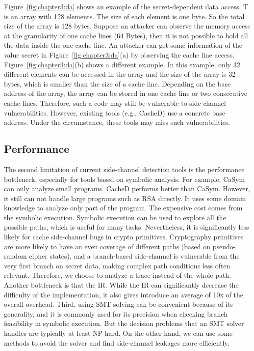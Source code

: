 Figure~\ref{fig:chapter3:da} shows an example of the secret-dependent data access. \textsf{T} is an array with 128 elements. The size of each element is one byte. So the total size of the array is 128 bytes. Suppose an attacker can observe the memory access at the granularity of one cache lines (64 Bytes), then it is not possible to hold all the data inside the one cache line. An attacker can get some information of the value \textsf{secret} in Figure~\ref{fig:chapter3:da}(a) by observing the cache line access. Figure~\ref{fig:chapter3:da}(b) shows a different example. In this example, only 32 different elements can be accessed in the array and the size of the array is 32 bytes, which is smaller than the size of a cache line. Depending on the base address of the array, the array can be stored in one cache line or two consecutive cache lines. Therefore, such a code may still be vulnerable to side-channel vulnerabilities. However, existing tools (e.g., CacheD) use a concrete base address. Under the circumstance, these tools may miss such vulnerabilities.

\subsection{Performance}
The second limitation of current side-channel detection tools is the performance bottleneck, especially for tools based on symbolic analysis. For example, CaSym can only analyze small programs. CacheD performs better than CaSym. However, it still can not handle large programs such as RSA directly. It uses some domain knowledge to analyze only part of the program. The expensive cost comes from the symbolic execution. Symbolic execution can be used to explore all the possible paths, which is useful for many tasks.
Nevertheless, it is significantly less likely for cache side-channel bugs in crypto primitives. Cryptography primitives are more likely to have an even coverage of different paths (based on pseudo-random cipher states), and a branch-based side-channel is vulnerable from the very first branch on secret data, making complex path conditions less often relevant. Therefore, we choose to analyze a trace instead of the whole path. Another bottleneck is that the IR. While the IR can significantly decrease the difficulty of the implementation, it also gives introduce an average of 10x of the overall overhead. Third, using SMT solving can be convenient because of its generality, and it is commonly used for its precision when checking branch feasibility in symbolic execution. But the decision problems that an SMT solver handles are typically at least NP-hard. On the other hand, we can use some methods to avoid the solver and find side-channel leakages more efficiently.

